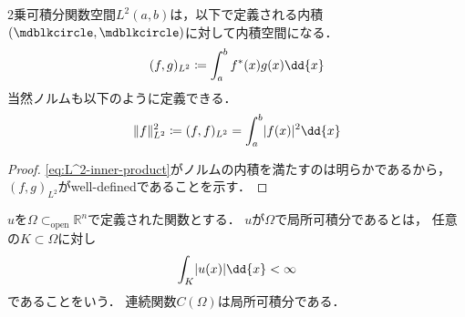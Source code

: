 \documentclass[../sotsu.tex]{subfiles}
\begin{document}
\begin{proposition}
    2乗可積分関数空間$L^2 (a, b)$は，以下で定義される内積$(\bigdot, \bigdot)$に対して内積空間になる．
    \begin{align}
        \label{eq:L^2-inner-product}
        (f, g)_{L^2} \coloneq \int_a^b \conj{f}(x) g(x) \dd{x}
    \end{align}
    当然ノルムも以下のように定義できる．
    \begin{align}
        \norm{f}_{L^2}^2 \coloneq (f, f)_{L^2} = \int_a^b \abs{f(x)}^2 \dd{x}
    \end{align}
\end{proposition}

\begin{proof}
    \cref{eq:L^2-inner-product}がノルムの内積を満たすのは明らかであるから，
    $(f, g)_{L^2}$がwell-definedであることを示す．
    
\end{proof}


$u$を$\Omega \subset_{\text{open}} ℝ^n$で定義された関数とする．
$u$が$\Omega$で局所可積分であるとは，
任意の$K \subset \Omega$に対し
\begin{equation*}
    \int_K \abs{ u(x) } \dd{x} < \infty
\end{equation*}
であることをいう．
連続関数$C(\Omega)$は局所可積分である．
\end{document}
